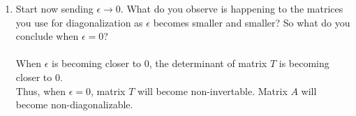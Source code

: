 \documentclass[letter, 11pt]{article}
\begin{document}
\begin{enumerate}[wide = 0pt, label = \textbf{Problem \arabic*:}]
\begin{enumerate}
			\item {Start now sending $ \epsilon \to 0 $. What do
				you observe is happening to the matrices you use for diagonalization as $ \epsilon $ becomes smaller and smaller? So
				what do you conclude when $ \epsilon = 0 $?} \\
			\\
			When $ \epsilon $ is becoming closer to 0, the determinant of matrix $ T $ is becoming closer to 0. \\
			Thus, when $ \epsilon = 0 $, matrix $ T $ will become non-invertable. Matrix $ A $ will become non-diagonalizable.
		\end{enumerate}
	\end{enumerate}
\end{document}
